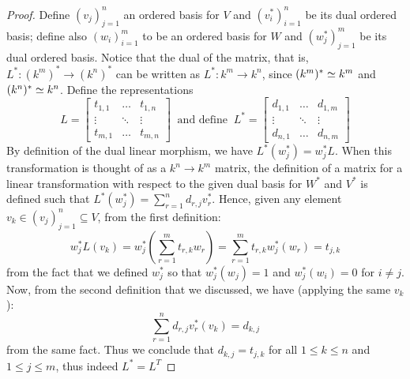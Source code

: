 \begin{proof}
    Define \((v_j)_{j=1}^n\) an ordered basis for \(V\) and \((v_i^\ast)_{i=1}^n\)
    be its dual ordered basis; define also \((w_i)_{i=1}^m\) to be an ordered
    basis for \(W\) and \((w_j^\ast)_{j=1}^m\) be its dual ordered basis. Notice
    that the dual of the matrix, that is, \(L^\ast : (k^m)^\ast \to (k^n)^\ast\)
    can be written as \(L^\ast : k^m \to k^n\), since \((k^m)^\ast \simeq k^m\) and
    \((k^n)^\ast \simeq k^n\). Define the representations
    \[
        L =
        \begin{bmatrix}
            t_{1, 1} & \dots  & t_{1, n} \\
            \vdots   & \ddots & \vdots   \\
            t_{m, 1} & \dots  & t_{m, n}
        \end{bmatrix}
        \ \text{ and define }\
        L^\ast =
        \begin{bmatrix}
            d_{1, 1} & \dots  & d_{1, m} \\
            \vdots   & \ddots & \vdots   \\
            d_{n, 1} & \dots  & d_{n, m}
        \end{bmatrix}
    \]
    By definition of the dual linear morphism, we have \(L^\ast(w_j^\ast) =
    w_j^\ast  L\). When this transformation is thought of as a \(k^n \to
    k^m\) matrix, the definition of a matrix for a linear transformation with
    respect to the given dual basis for \(W^\ast\) and \(V^\ast\) is defined such
    that \(L^\ast(w_j^\ast) = \sum_{r = 1}^n d_{r, j} v_r^\ast\). Hence, given any
    element \(v_k \in (v_j)_{j=1}^n \subseteq V\), from the first definition:
    \begin{equation}
        w_j^\ast  L (v_k)
        = w_j^\ast \left( \sum_{r=1}^m t_{r, k} w_r \right)
        = \sum_{r=1}^m t_{r, k} w_j^\ast(w_r)
        = t_{j, k}
    \end{equation}
    from the fact that we defined \(w_j^\ast\) so that \(w_j^\ast(w_j) = 1\) and
    \(w_j^\ast(w_i) = 0\) for \(i \neq j\). Now, from the second definition that
    we discussed, we have (applying the same \(v_k\)):
    \begin{equation}
        \sum_{r=1}^n d_{r,j} v_r^\ast(v_k)
        = d_{k, j}
    \end{equation}
    from the same fact. Thus we conclude that \(d_{k,j} = t_{j,k}\) for all \(1
    \leq k \leq n\) and \(1 \leq j \leq m\), thus indeed \(L^\ast = L^T\)
\end{proof}

